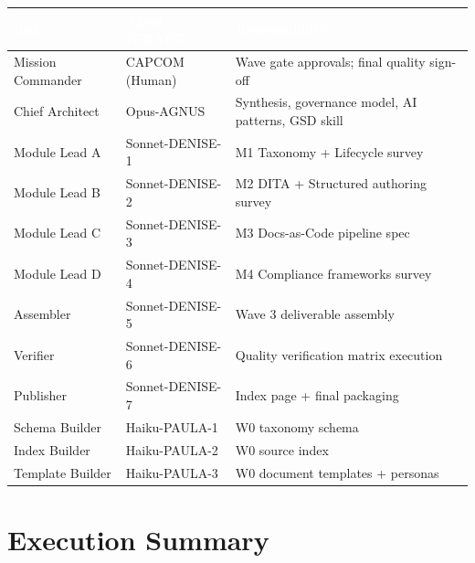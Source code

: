\documentclass[11pt,letterpaper]{article}
\newcommand{\tableheader}[1]{\textbf{\sffamily\textcolor{white}{#1}}}
\begin{document}
\begin{center}
\begin{tabularx}{\textwidth}{L{3cm}L{3cm}X}
\toprule
{}
\tableheader{Role} & \tableheader{Agent (CRAFT)} & \tableheader{Responsibility} \\
\midrule
Mission Commander & CAPCOM (Human) & Wave gate approvals; final quality sign-off \\
Chief Architect & Opus-AGNUS & Synthesis, governance model, AI patterns, GSD skill \\
Module Lead A & Sonnet-DENISE-1 & M1 Taxonomy + Lifecycle survey \\
Module Lead B & Sonnet-DENISE-2 & M2 DITA + Structured authoring survey \\
Module Lead C & Sonnet-DENISE-3 & M3 Docs-as-Code pipeline spec \\
Module Lead D & Sonnet-DENISE-4 & M4 Compliance frameworks survey \\
Assembler & Sonnet-DENISE-5 & Wave 3 deliverable assembly \\
Verifier & Sonnet-DENISE-6 & Quality verification matrix execution \\
Publisher & Sonnet-DENISE-7 & Index page + final packaging \\
Schema Builder & Haiku-PAULA-1 & W0 taxonomy schema \\
Index Builder & Haiku-PAULA-2 & W0 source index \\
Template Builder & Haiku-PAULA-3 & W0 document templates + personas \\
\bottomrule
\end{tabularx}
\end{center}

\section{Execution Summary}
\end{document}
